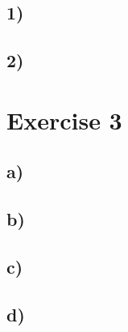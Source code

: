 \documentclass[fleqn,12pt]{article}
\begin{document}
\subsection*{1)}

\subsection*{2)}

\section*{Exercise 3}
\subsection*{a)}

\subsection*{b)}

\subsection*{c)}

\subsection*{d)}
\end{document}
